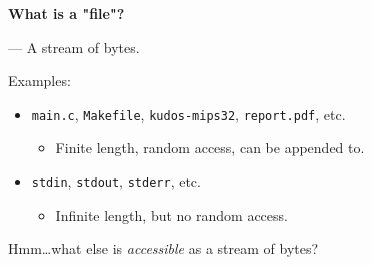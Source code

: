 \begin{frame}

\begin{center}

\Large \textbf{What is a "file"?}

\end{center}

\pause

\begin{flushright}

--- A stream of bytes.

\end{flushright}

Examples:

\begin{itemize}

\item \texttt{main.c}, \texttt{Makefile}, \texttt{kudos-mips32},
\texttt{report.pdf}, etc.

\begin{itemize}

\item Finite length, random access, can be appended to.

\end{itemize}

\item \texttt{stdin}, \texttt{stdout}, \texttt{stderr}, etc.

\begin{itemize}

\item Infinite length, but no random access.

\end{itemize}

\end{itemize}

\vspace{\fill}

\begin{center}

Hmm\ldots what else is \emph{accessible} as a stream of bytes?

\end{center}

\end{frame}


